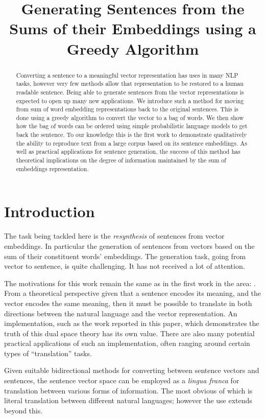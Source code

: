 \documentclass[11pt]{article}
\title{Generating Sentences from the Sums of their Embeddings using a Greedy Algorithm}
\author{}
\theoremstyle{plain}
\theoremstyle{definition}
\begin{document}
\maketitle

\begin{abstract}
Converting a sentence to a meaningful vector representation has uses in many NLP tasks, however very few methods allow that representation to be restored to a human readable sentence. Being able to generate sentences from the vector representations is expected to open up many new applications. We introduce such a method for moving from sum of word embedding representations back to the original sentences. This is done using a greedy algorithm to convert the vector to a bag of words. We then show how the bag of words can be ordered using simple probabilistic language models to get back the sentence. To our knowledge this is the first work to demonstrate qualitatively the ability to reproduce text from a large corpus based on its sentence embeddings. 
As well as practical applications for sentence generation, the success of this method has theoretical implications on the degree of information maintained by the sum of embeddings representation.
\end{abstract}

\section{Introduction} \label{intro}
The task being tackled here is the \emph{resynthesis} of sentences from vector embeddings. In particular the generation of sentences from vectors based on the sum of their constituent words' embeddings. The generation task, going from vector to sentence, is quite challenging. It has not received a lot of attention.

The motivations for this work remain the same as in the first work in the area: \textcite{Dinu2014CompositionalGeneration}. From a theoretical perspective given that a sentence encodes its meaning, and the vector encodes the same meaning, then it must be possible to translate in both directions between the natural language and the vector representation. An implementation, such as the work reported in this paper, which demonstrates the truth of this dual space theory has its own value. There are also many potential practical applications of such an implementation, often ranging around certain types of ``translation'' tasks.

Given suitable bidirectional methods for converting between sentence vectors and sentences, the sentence vector space can be employed as a \emph{lingua franca} for translation between various forms of information. The most obvious of which is literal translation between different natural languages; however the use extends beyond this.
\end{document}
